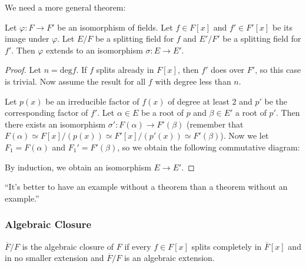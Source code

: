\documentclass[10pt, twoside]{article}
\begin{document}
    We need a more general theorem:

    \begin{thm}
        Let $\varphi:F \rightarrow F'$ be an isomorphism of fields. Let $f \in F[x]$ and $f' \in F'[x]$ be its image under $\varphi$. Let $E/F$ be a splitting field for $f$ and $E'/F'$ be a splitting field for $f'$. Then $\varphi$ extends to an isomorphism $\sigma: E \rightarrow E'$.
        \begin{proof}
            Let $n = \mathrm{deg}f$. If $f$ splits already in $F[x]$, then $f'$ does over $F'$, so this case is trivial. Now assume the result for all $f$ with degree less than $n$.

            Let $p(x)$ be an irreducible factor of $f(x)$ of degree at least $2$ and $p'$ be the corresponding factor of $f'$. Let $\alpha \in E$ be a root of $p$ and $\beta \in E'$ a root of $p'$. Then there exists an isomorphism $\sigma':F(\alpha) \rightarrow F'(\beta)$ (remember that $F(\alpha) \simeq F[x]/(p(x)) \simeq F'[x]/(p'(x)) \simeq F'(\beta)$). Now we let $F_1 = F(\alpha)$ and $F_1' = F'(\beta)$, so we obtain the following commutative diagram:

            \begin{center}
            \end{center}
            By induction, we obtain an isomorphism $E \rightarrow E'$.
        \end{proof}
    \end{thm}

    ``It's better to have an example without a theorem than a theorem without an example.''

    \subsubsection{Algebraic Closure}

    \begin{defn}
        $\overline{F}/F$ is the algebraic closure of $F$ if every $f \in F[x]$ splits completely in $\overline{F}[x]$ and in no smaller extension and $\overline{F}/F$ is an algebraic extension.
    \end{defn}
\end{document}
